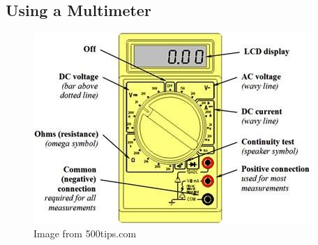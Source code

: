 \documentclass{article}
\theoremstyle{definition}
\theoremstyle{definition}
\theoremstyle{remark}
\begin{document}

  \subsection{Using a Multimeter} %
  \label{sub:using_a_multimeter}

    \begin{figure}[!ht]
      \centering
      \includegraphics[width=0.65\paperwidth]{Images/image_a_1_(multimeter).png}
      \caption*{Image from 500tips.com}
    \end{figure}
  

\end{document}
